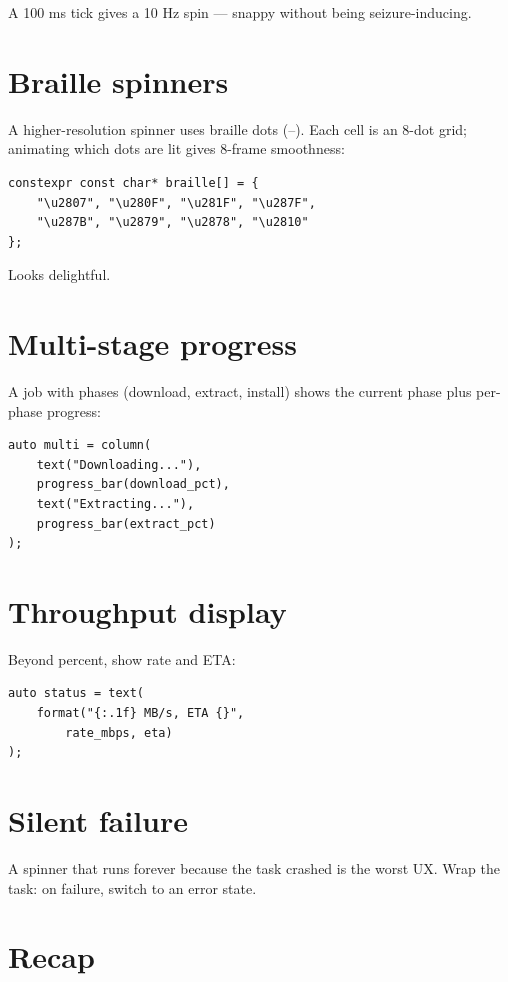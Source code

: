 A 100 ms tick gives a 10 Hz spin --- snappy without being
seizure-inducing.

\section{Braille spinners}

A higher-resolution spinner uses braille dots
(--). Each cell is an 8-dot grid;
animating which dots are lit gives 8-frame smoothness:

\begin{lstlisting}
constexpr const char* braille[] = {
    "\u2807", "\u280F", "\u281F", "\u287F",
    "\u287B", "\u2879", "\u2878", "\u2810"
};
\end{lstlisting}

Looks delightful.

\section{Multi-stage progress}

A job with phases (download, extract, install) shows the
current phase plus per-phase progress:

\begin{lstlisting}
auto multi = column(
    text("Downloading..."),
    progress_bar(download_pct),
    text("Extracting..."),
    progress_bar(extract_pct)
);
\end{lstlisting}

\section{Throughput display}

Beyond percent, show rate and ETA:

\begin{lstlisting}
auto status = text(
    format("{:.1f} MB/s, ETA {}",
        rate_mbps, eta)
);
\end{lstlisting}

\section{Silent failure}

A spinner that runs forever because the task crashed is the
worst UX. Wrap the task: on failure, switch to an error
state.

\section{Recap}


